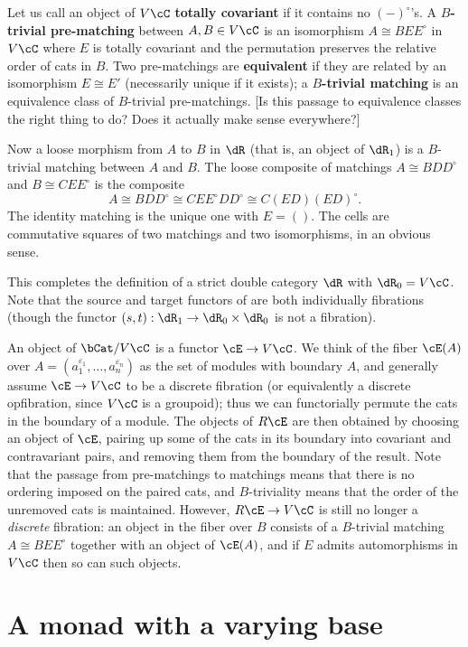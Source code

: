 \documentclass{amsart}
\newcommand{\C}{\cC}
\newcommand{\E}{\cE}
\renewcommand{\o}{^{\circ}}
\newcommand{\e}[1][]{^{\varepsilon_{#1}}}
\begin{document}
Let us call an object of $V\C$ \textbf{totally covariant} if it contains no $(-)\o$'s.
A \textbf{$B$-trivial pre-matching} between $A,B\in V\C$ is an isomorphism $A \cong B E E\o$ in $V\C$ where $E$ is totally covariant and the permutation preserves the relative order of cats in $B$.
Two pre-matchings are \textbf{equivalent} if they are related by an isomorphism $E\cong E'$ (necessarily unique if it exists); a \textbf{$B$-trivial matching} is an equivalence class of $B$-trivial pre-matchings.
[Is this passage to equivalence classes the right thing to do?  Does it actually make sense everywhere?]

Now a loose morphism from $A$ to $B$ in $\dR$ (that is, an object of $\dR_1$) is a $B$-trivial matching between $A$ and $B$.
The loose composite of matchings $A\cong B D D\o$ and $B \cong C E E\o$ is the composite
\[ A\cong B D D\o \cong C E E\o D D\o \cong C (E D) (E D)\o. \]
The identity matching is the unique one with $E=()$.
The cells are commutative squares of two matchings and two isomorphisms, in an obvious sense.

This completes the definition of a strict double category $\dR$ with $\dR_0 = V\C$.
Note that the source and target functors of \dR are both individually fibrations (though the functor $(s,t):\dR_1 \to \dR_0\times \dR_0$ is not a fibration).

An object of $\bCat/V\C$ is a functor $\E\to V\C$.
We think of the fiber $\E(A)$ over $A=(a_1\e[1],\dots,a_n\e[n])$ as the set of modules with boundary $A$, and generally assume $\E\to V\C$ to be a discrete fibration (or equivalently a discrete opfibration, since $V\C$ is a groupoid); thus we can functorially permute the cats in the boundary of a module.
The objects of $R\E$ are then obtained by choosing an object of $\E$, pairing up some of the cats in its boundary into covariant and contravariant pairs, and removing them from the boundary of the result.
Note that the passage from pre-matchings to matchings means that there is no ordering imposed on the paired cats, and $B$-triviality means that the order of the unremoved cats is maintained.
However, $R\E\to V\C$ is still no longer a \emph{discrete} fibration: an object in the fiber over $B$ consists of a $B$-trivial matching $A\cong BEE\o$ together with an object of $\E(A)$, and if $E$ admits automorphisms in $V\C$ then so can such objects.

\section{A monad with a varying base}
\label{sec:monad-with-varying}
\end{document}
